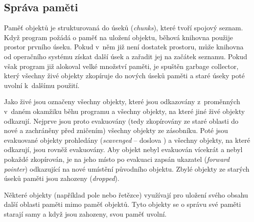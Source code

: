 \subsection{Správa paměti}

Paměť objektů je strukturovaná do úseků (\emph{chunks}), které tvoří spojový
seznam. Když program požádá o paměť na uložení objektu, běhová knihovna použije
prostor prvního úseku. Pokud v~něm již není dostatek prostoru, může knihovna od
operačního systému získat další úsek a zařadit jej na začátek seznamu. Pokud
však program již alokoval velké množství paměti, je spuštěn garbage collector,
který všechny živé objekty zkopíruje do nových úseků paměti a staré úseky poté
uvolní k~dalšímu použití.

Jako živé jsou označeny všechny objekty, které jsou odkazovány z~proměnných
v~daném okamžiku běhu programu a všechny objekty, na které jiné živé objekty
odkazují. Nejprve jsou proto evakuovány (tedy zkopírovány ze staré oblasti do
nové a zachráněny před zničením) všechny objekty ze zásobníku. Poté jsou
evakuované objekty prohledány (\emph{scavenged} -- doslova ) a všechny objekty, na které odkazují, jsou rovněž evakuovány. Aby
objekt nebyl evakuován vícekrát a nebyl pokaždé zkopírován, je na jeho místo po
evakuaci zapsán ukazatel (\emph{forward pointer}) odkazující na nové umístění
původního objektu. Zbylé objekty ze starých úseků paměti jsou zahozeny
(\emph{dropped}).

Některé objekty (například pole nebo řetězce) využívají pro uložení svého obsahu
další oblasti paměti mimo paměť objektů. Tyto objekty se o správu své paměti
starají samy a když jsou zahozeny, svou paměť uvolní.
